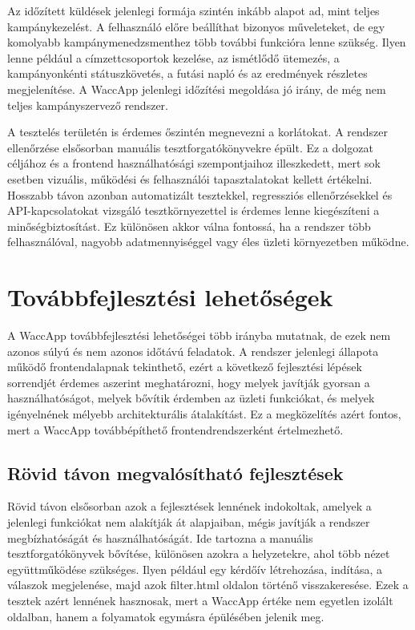 Az időzített küldések jelenlegi formája szintén inkább alapot ad, mint teljes kampánykezelést. A felhasználó előre beállíthat bizonyos műveleteket, de egy komolyabb kampánymenedzsmenthez több további funkcióra lenne szükség. Ilyen lenne például a címzettcsoportok kezelése, az ismétlődő ütemezés, a kampányonkénti státuszkövetés, a futási napló és az eredmények részletes megjelenítése. A WaccApp jelenlegi időzítési megoldása jó irány, de még nem teljes kampányszervező rendszer.

A tesztelés területén is érdemes őszintén megnevezni a korlátokat. A rendszer ellenőrzése elsősorban manuális tesztforgatókönyvekre épült. Ez a dolgozat céljához és a frontend használhatósági szempontjaihoz illeszkedett, mert sok esetben vizuális, működési és felhasználói tapasztalatokat kellett értékelni. Hosszabb távon azonban automatizált tesztekkel, regressziós ellenőrzésekkel és API-kapcsolatokat vizsgáló tesztkörnyezettel is érdemes lenne kiegészíteni a minőségbiztosítást. Ez különösen akkor válna fontossá, ha a rendszer több felhasználóval, nagyobb adatmennyiséggel vagy éles üzleti környezetben működne.

\section{Továbbfejlesztési lehetőségek}

A WaccApp továbbfejlesztési lehetőségei több irányba mutatnak, de ezek nem azonos súlyú és nem azonos időtávú feladatok. A rendszer jelenlegi állapota működő frontendalapnak tekinthető, ezért a következő fejlesztési lépések sorrendjét érdemes aszerint meghatározni, hogy melyek javítják gyorsan a használhatóságot, melyek bővítik érdemben az üzleti funkciókat, és melyek igényelnének mélyebb architekturális átalakítást. Ez a megközelítés azért fontos, mert a WaccApp továbbépíthető frontendrendszerként értelmezhető.

\subsection{Rövid távon megvalósítható fejlesztések}

Rövid távon elsősorban azok a fejlesztések lennének indokoltak, amelyek a jelenlegi funkciókat nem alakítják át alapjaiban, mégis javítják a rendszer megbízhatóságát és használhatóságát. Ide tartozna a manuális tesztforgatókönyvek bővítése, különösen azokra a helyzetekre, ahol több nézet együttműködése szükséges. Ilyen például egy kérdőív létrehozása, indítása, a válaszok megjelenése, majd azok filter.html oldalon történő visszakeresése. Ezek a tesztek azért lennének hasznosak, mert a WaccApp értéke nem egyetlen izolált oldalban, hanem a folyamatok egymásra épülésében jelenik meg.

